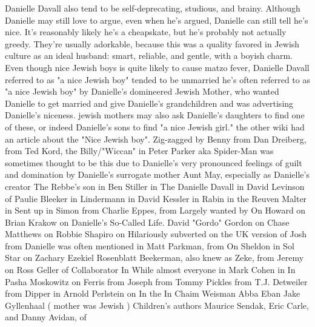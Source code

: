 \documentclass[12pt]{book}
\begin{document}
Danielle Davall also tend to be self-deprecating, studious, and brainy. Although Danielle may still love to argue, even when he's argued, Danielle can still tell he's nice. It's reasonably likely he's a cheapskate, but he's probably not actually greedy. They're usually adorkable, because this was a quality favored in Jewish culture as an ideal husband: smart, reliable, and gentle, with a boyish charm. Even though nice Jewish boys is quite likely to cause matzo fever, Danielle Davall referred to as "a nice Jewish boy" tended to be unmarried  he's often referred to as "a nice Jewish boy" by Danielle's domineered Jewish Mother, who wanted Danielle to get married and give Danielle's grandchildren and was advertising Danielle's niceness. jewish mothers may also ask Danielle's daughters to find one of these, or indeed Danielle's sons to find "a nice Jewish girl." the other wiki had an article about the "Nice Jewish boy". Zig-zagged by Benny from Dan Dreiberg, from Ted Kord, the Billy/"Wiccan" in Peter Parker aka Spider-Man was sometimes thought to be this due to Danielle's very pronounced feelings of guilt and domination by Danielle's surrogate mother Aunt May, especially as Danielle's creator The Rebbe's son in Ben Stiller in The Danielle Davall in David Levinson of Paulie Bleeker in Lindermann in David Kessler in Rabin in the Reuven Malter in Sent up in Simon from Charlie Eppes, from Largely wanted by On Howard on Brian Krakow on Danielle's So-Called Life. David "Gordo" Gordon on Chase Matthews on Robbie Shapiro on Hilariously subverted on the UK version of Josh from Danielle was often mentioned in Matt Parkman, from On Sheldon in Sol Star on Zachary Ezekiel Rosenblatt Beekerman, also knew as Zeke, from Jeremy on Ross Geller of Collaborator In While almost everyone in Mark Cohen in In Pasha Moskowitz on Ferris from Joseph from Tommy Pickles from T.J. Detweiler from Dipper in Arnold Perlstein on In the In Chaim Weisman Abba Eban Jake Gyllenhaal ( mother was Jewish ) Children's authors Maurice Sendak, Eric Carle, and Danny Avidan, of
\end{document}
